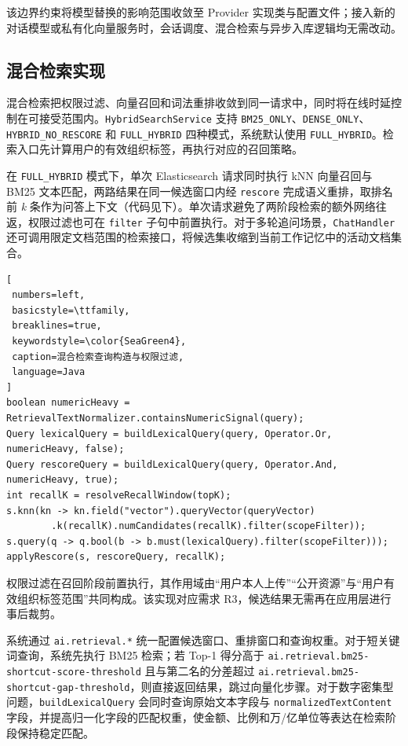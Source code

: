该边界约束将模型替换的影响范围收敛至 Provider 实现类与配置文件；接入新的对话模型或私有化向量服务时，会话调度、混合检索与异步入库逻辑均无需改动。

\subsection{混合检索实现}

混合检索把权限过滤、向量召回和词法重排收敛到同一请求中，同时将在线时延控制在可接受范围内。\texttt{HybridSearchService} 支持 \texttt{BM25\_ONLY}、\texttt{DENSE\_ONLY}、\texttt{HYBRID\_NO\_RESCORE} 和 \texttt{FULL\_HYBRID} 四种模式，系统默认使用 \texttt{FULL\_HYBRID}。检索入口先计算用户的有效组织标签，再执行对应的召回策略。

在 \texttt{FULL\_HYBRID} 模式下，单次 Elasticsearch 请求同时执行 kNN 向量召回与 BM25 文本匹配，两路结果在同一候选窗口内经 \texttt{rescore} 完成语义重排，取排名前 \textit{k} 条作为问答上下文（代码见下）。单次请求避免了两阶段检索的额外网络往返，权限过滤也可在 \texttt{filter} 子句中前置执行。对于多轮追问场景，\texttt{ChatHandler} 还可调用限定文档范围的检索接口，将候选集收缩到当前工作记忆中的活动文档集合。

\begin{lstlisting}[
 numbers=left,
 basicstyle=\ttfamily,
 breaklines=true,
 keywordstyle=\color{SeaGreen4},
 caption=混合检索查询构造与权限过滤,
 language=Java
]
boolean numericHeavy = RetrievalTextNormalizer.containsNumericSignal(query);
Query lexicalQuery = buildLexicalQuery(query, Operator.Or, numericHeavy, false);
Query rescoreQuery = buildLexicalQuery(query, Operator.And, numericHeavy, true);
int recallK = resolveRecallWindow(topK);
s.knn(kn -> kn.field("vector").queryVector(queryVector)
        .k(recallK).numCandidates(recallK).filter(scopeFilter));
s.query(q -> q.bool(b -> b.must(lexicalQuery).filter(scopeFilter)));
applyRescore(s, rescoreQuery, recallK);
\end{lstlisting}

权限过滤在召回阶段前置执行，其作用域由“用户本人上传”“公开资源”与“用户有效组织标签范围”共同构成。该实现对应需求 R3，候选结果无需再在应用层进行事后裁剪。

系统通过 \texttt{ai.retrieval.*} 统一配置候选窗口、重排窗口和查询权重。对于短关键词查询，系统先执行 BM25 检索；若 Top-1 得分高于 \texttt{ai.retrieval.bm25-shortcut-score-threshold} 且与第二名的分差超过 \texttt{ai.retrieval.bm25-shortcut-gap-threshold}，则直接返回结果，跳过向量化步骤。对于数字密集型问题，\texttt{buildLexicalQuery} 会同时查询原始文本字段与 \texttt{normalizedTextContent} 字段，并提高归一化字段的匹配权重，使金额、比例和万/亿单位等表达在检索阶段保持稳定匹配。

